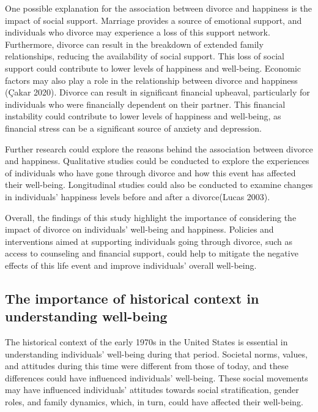 \documentclass[
  letterpaper,
  DIV=11,
  numbers=noendperiod]{scrartcl}
\begin{document}
One possible explanation for the association between divorce and
happiness is the impact of social support. Marriage provides a source of
emotional support, and individuals who divorce may experience a loss of
this support network. Furthermore, divorce can result in the breakdown
of extended family relationships, reducing the availability of social
support. This loss of social support could contribute to lower levels of
happiness and well-being. Economic factors may also play a role in the
relationship between divorce and happiness (Çakar 2020). Divorce can
result in significant financial upheaval, particularly for individuals
who were financially dependent on their partner. This financial
instability could contribute to lower levels of happiness and
well-being, as financial stress can be a significant source of anxiety
and depression.

Further research could explore the reasons behind the association
between divorce and happiness. Qualitative studies could be conducted to
explore the experiences of individuals who have gone through divorce and
how this event has affected their well-being. Longitudinal studies could
also be conducted to examine changes in individuals' happiness levels
before and after a divorce(Lucas 2003).

Overall, the findings of this study highlight the importance of
considering the impact of divorce on individuals' well-being and
happiness. Policies and interventions aimed at supporting individuals
going through divorce, such as access to counseling and financial
support, could help to mitigate the negative effects of this life event
and improve individuals' overall well-being.

\hypertarget{the-importance-of-historical-context-in-understanding-well-being}{%
\subsection{The importance of historical context in understanding
well-being}\label{the-importance-of-historical-context-in-understanding-well-being}}

The historical context of the early 1970s in the United States is
essential in understanding individuals' well-being during that period.
Societal norms, values, and attitudes during this time were different
from those of today, and these differences could have influenced
individuals' well-being. These social movements may have influenced
individuals' attitudes towards social stratification, gender roles, and
family dynamics, which, in turn, could have affected their well-being.
\end{document}
